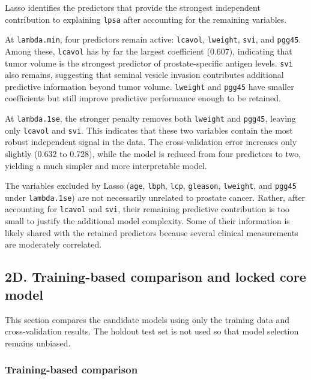 \documentclass[
  11pt,
]{article}
\begin{document}
Lasso identifies the predictors that provide the strongest independent
contribution to explaining \texttt{lpsa} after accounting for the
remaining variables.

At \texttt{lambda.min}, four predictors remain active: \texttt{lcavol},
\texttt{lweight}, \texttt{svi}, and \texttt{pgg45}. Among these,
\texttt{lcavol} has by far the largest coefficient (0.607), indicating
that tumor volume is the strongest predictor of prostate-specific
antigen levels. \texttt{svi} also remains, suggesting that seminal
vesicle invasion contributes additional predictive information beyond
tumor volume. \texttt{lweight} and \texttt{pgg45} have smaller
coefficients but still improve predictive performance enough to be
retained.

At \texttt{lambda.1se}, the stronger penalty removes both
\texttt{lweight} and \texttt{pgg45}, leaving only \texttt{lcavol} and
\texttt{svi}. This indicates that these two variables contain the most
robust independent signal in the data. The cross-validation error
increases only slightly (0.632 to 0.728), while the model is reduced
from four predictors to two, yielding a much simpler and more
interpretable model.

The variables excluded by Lasso (\texttt{age}, \texttt{lbph},
\texttt{lcp}, \texttt{gleason}, \texttt{lweight}, and \texttt{pgg45}
under \texttt{lambda.1se}) are not necessarily unrelated to prostate
cancer. Rather, after accounting for \texttt{lcavol} and \texttt{svi},
their remaining predictive contribution is too small to justify the
additional model complexity. Some of their information is likely shared
with the retained predictors because several clinical measurements are
moderately correlated.

\subsection{2D. Training-based comparison and locked core
model}\label{d.-training-based-comparison-and-locked-core-model}

This section compares the candidate models using only the training data
and cross-validation results. The holdout test set is not used so that
model selection remains unbiased.

\subsubsection{Training-based
comparison}\label{training-based-comparison}
\end{document}
